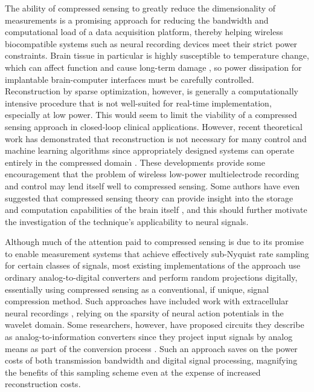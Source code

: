 \documentclass[11pt]{paper}
\begin{document}
The ability of compressed sensing to greatly reduce the dimensionality of
measurements is a promising approach for reducing the bandwidth and 
computational load of a data acquisition platform, thereby helping wireless 
biocompatible systems such as neural recording devices meet their strict
power constraints. Brain tissue in particular is highly susceptible to
temperature change, which can affect function and cause long-term damage 
\cite{cais2008}, so power dissipation for implantable brain-computer 
interfaces must be carefully controlled. Reconstruction by sparse 
optimization, however, is generally a computationally intensive procedure 
that is not well-suited for real-time implementation, especially at low 
power. This would seem to limit the viability of a compressed sensing 
approach in closed-loop clinical applications. However, recent theoretical 
work has demonstrated that reconstruction is not necessary for many control
and machine learning algorithms since appropriately designed systems can 
operate entirely in the compressed domain \cite{ganguli2012}. These 
developments provide some encouragement that the problem of wireless
low-power multielectrode recording and control may lend itself well to
compressed sensing. Some authors have even suggested that compressed 
sensing theory can provide insight into the storage and computation
capabilities of the brain itself \cite{ganguli2012}, and this should 
further motivate the investigation of the technique's applicability to
neural signals.

Although much of the attention paid to compressed sensing is due to its
promise to enable measurement systems that achieve effectively sub-Nyquist
rate sampling for certain classes of signals, most existing implementations
of the approach use ordinary analog-to-digital converters and perform 
random projections digitally, essentially using compressed sensing as a 
conventional, if unique, signal compression method. Such approaches have
included work with extracellular neural recordings 
\cite{charbiwala2011}, relying on the sparsity of neural action potentials 
in the wavelet domain. Some researchers, however, have proposed circuits 
they describe as analog-to-information  converters since they project input 
signals by analog means as part of the conversion process 
\cite{kirolos2006}. Such an approach saves on the power costs of both 
transmission bandwidth and digital signal processing, magnifying the 
benefits of this sampling scheme even at the expense of increased 
reconstruction costs.
\end{document}
